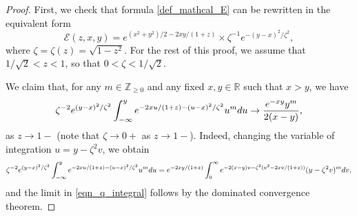 \documentclass[10pt,a4paper]{amsart}
\def\E{{\mathcal E}}
\def\d{{\textnormal d}}
\def\r{{\mathbb R}}
\begin{document}
\begin{proof}
First, we check that formula \eqref{def_mathcal_E} can be rewritten in the equivalent form  
\begin{equation}\label{E_factorization}
\E(z,x,y)  =e^{(x^2+y^2)/2  - 2xy/(1+z)} \times 
\zeta^{-1} 
e^{-(y-x)^2/\zeta^2 },
\end{equation}
where $\zeta=\zeta(z)=\sqrt{1-z^2}$. For the rest of this proof, we assume that $1/\sqrt{2}<z<1$, so that $0<\zeta<1/\sqrt{2}$.  


 
We claim that, for any $m\in {\mathbb Z}_{\geqslant 0}$ and any fixed $x,y \in \r$  such that $x>y$, we have
\begin{equation}\label{eqn_q_integral}
\zeta^{-2} e^{(y-x)^2/\zeta^2} \int_{-\infty}^y  
e^{-2xu/(1+z)-(u-x)^2/\zeta^2}   u^m \d u \to 
\frac{e^{-x y}y^m}{2(x-y)},  
\end{equation}
as $z\to 1-$ (note that $\zeta\to 0+$ as $z\to 1-$). 
Indeed, changing the variable of integration $u=y-\zeta^2 v$, we obtain
\[
\zeta^{-2}  e^{(y-x)^2/\zeta^2}  \int_{-\infty}^y  
e^{-2xu/(1+z)-(u-x)^2/\zeta^2}   u^m \d u
= e^{-2x y/(1+z)} \int_0^{\infty} e^{-2(x-y)v -\zeta^2 (v^2-2xv/(1+z))}  (y-\zeta^2 v)^m \d v,
\]
and the limit in \eqref{eqn_q_integral} follows by the dominated convergence theorem. 





\end{proof}
\end{document}
